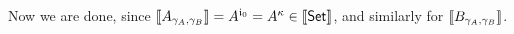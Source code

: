 \documentclass{article}
\begin{document}

Now we are done, since %
$\llbracket A_{\gamma_A, \gamma_B} \rrbracket = A^{\mathfrak{i}_0} = A^{\kappa} \in
\llbracket \mathsf{Set} \rrbracket$, and similarly for $\llbracket B_{\gamma_A, \gamma_B} \rrbracket$.






\end{document}
